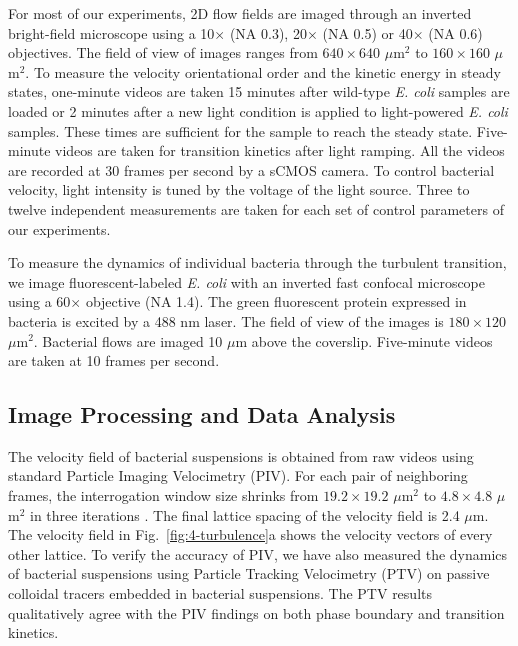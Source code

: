 For most of our experiments, 2D flow fields are imaged through an inverted bright-field microscope using a 10$\times$ (NA 0.3), 20$\times$ (NA 0.5) or 40$\times$ (NA 0.6) objectives. The field of view of images ranges from $640 \times 640$ $\mu$m$^2$ to $160 \times 160$ $\mu$m$^2$. To measure the velocity orientational order and the kinetic energy in steady states, one-minute videos are taken 15 minutes after wild-type \textit{E. coli} samples are loaded or 2 minutes after a new light condition is applied to light-powered \textit{E. coli} samples. These times are sufficient for the sample to reach the steady state. Five-minute videos are taken for transition kinetics after light ramping. All the videos are recorded at 30 frames per second by a sCMOS camera. To control bacterial velocity, light intensity is tuned by the voltage of the light source. Three to twelve independent measurements are taken for each set of control parameters of our experiments.

To measure the dynamics of individual bacteria through the turbulent transition, we image fluorescent-labeled \textit{E. coli} with an inverted fast confocal microscope using a 60$\times$ objective (NA 1.4). The green fluorescent protein expressed in bacteria is excited by a 488 nm laser. The field of view of the images is $180 \times 120$ $\mu$m$^2$. Bacterial flows are imaged 10 $\mu$m above the coverslip. Five-minute videos are taken at 10 frames per second.

\subsection{Image Processing and Data Analysis}
The velocity field of bacterial suspensions is obtained from raw videos using standard Particle Imaging Velocimetry (PIV). For each pair of neighboring frames, the interrogation window size shrinks from $19.2 \times 19.2$ $\mu$m$^2$ to $4.8 \times 4.8$ $\mu$m$^2$ in three iterations \cite{Scarano2001}. The final lattice spacing of the velocity field is 2.4 $\mu$m. The velocity field in Fig.~\ref{fig:4-turbulence}a shows the velocity vectors of every other lattice. To verify the accuracy of PIV,
we have also measured the dynamics of bacterial suspensions using Particle Tracking Velocimetry (PTV) on passive colloidal tracers embedded in bacterial suspensions. The PTV results qualitatively agree with the PIV findings on both phase boundary and transition kinetics.

